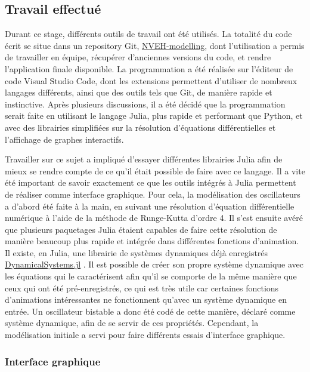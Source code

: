 \documentclass[a4paper, french, 12pt, titlepage]{article}
\begin{document}
\subsection{Travail effectué}


Durant ce stage, différents outils de travail ont été utilisés.
La totalité du code écrit se situe dans un repository Git, \href{https://github.com/SalsyUniate/NVEH-modelling}{NVEH-modelling}, dont l'utilisation a permis de travailler en équipe, récupérer d'anciennes versions du code, et rendre l'application finale disponible.
La programmation a été réalisée sur l'éditeur de code Visual Studio Code, dont les extensions permettent d'utiliser de nombreux langages différents, ainsi que des outils tels que Git, de manière rapide et instinctive.
Après plusieurs discussions, il a été décidé que la programmation serait faite en utilisant le langage Julia, plus rapide et performant que Python, et avec des librairies simplifiées sur la résolution d'équations différentielles et l'affichage de graphes interactifs.

Travailler sur ce sujet a impliqué d'essayer différentes librairies Julia afin de mieux se rendre compte de ce qu'il était possible de faire avec ce langage.
Il a vite été important de savoir exactement ce que les outils intégrés à Julia permettent de réaliser comme interface graphique.
Pour cela, la modélisation des oscillateurs a d'abord été faite \og à la main\fg, en suivant une résolution d'équation différentielle numérique à l'aide de la méthode de Runge-Kutta d'ordre 4.
Il s'est ensuite avéré que plusieurs paquetages Julia étaient capables de faire cette résolution de manière beaucoup plus rapide et intégrée dans différentes fonctions d'animation.
Il existe, en Julia, une librairie de systèmes dynamiques déjà enregistrés \href{https://juliadynamics.github.io/DynamicalSystems.jl/latest/}{DynamicalSystems.jl} \cite{Datseris2018}.
Il est possible de créer son propre système dynamique avec les équations qui le caractérisent afin qu'il se comporte de la même manière que ceux qui ont été pré-enregistrés, ce qui est très utile car certaines fonctions d'animations intéressantes ne fonctionnent qu'avec un système dynamique en entrée.
Un oscillateur bistable a donc été codé de cette manière, déclaré comme système dynamique, afin de se servir de ces propriétés.
Cependant, la modélisation initiale a servi pour faire différents essais d'interface graphique.


\subsubsection{Interface graphique}
\end{document}
